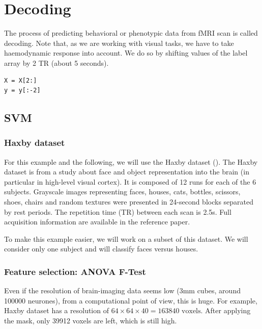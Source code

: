 \documentclass{frontiersSCNS} %
\begin{document}

\section{Decoding}

The process of predicting behavioral or phenotypic data from fMRI scan is
called decoding. Note that, as we are working with visual tasks, we have to take
haemodynamic response into account. We do so by shifting values of the label
array by 2 TR (about 5 seconds).

\begin{lstlisting}
X = X[2:]
y = y[:-2]
\end{lstlisting}

\subsection{SVM}

\subsubsection{Haxby dataset}

For this example and the following, we will use the Haxby dataset
(\cite{haxby2001}).
The Haxby dataset is from a study about face and object representation into the
brain (in particular in high-level visual cortex). It is composed of 12 runs for
each of the 6 subjects. Grayscale images representing faces, houses, cats,
bottles, scissors, shoes, chairs and random textures were presented in
24-second blocks separated by rest periods. The repetition time (TR) between each
scan is 2.5s. Full acquisition information are available in the reference paper.

To make this example easier, we will work on a subset of this dataset. We will
consider only one subject and will classify faces versus houses.

\subsubsection{Feature selection: ANOVA F-Test}

Even if the resolution of brain-imaging data seems low (3mm cubes, around 100000
neurones), from a computational point of view, this is huge. For example,
Haxby dataset has a resolution of $64\times64\times40 = 163840\text{ voxels}$.
After applying the mask, only 39912 voxels are left, which is still high.
\end{document}
